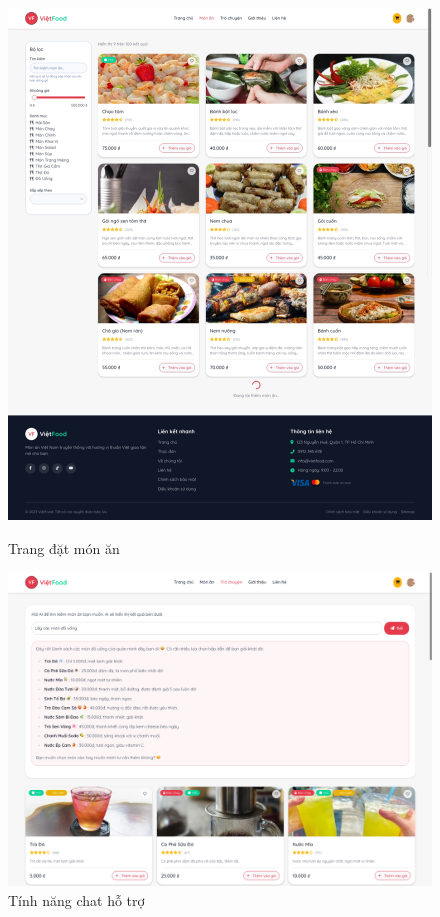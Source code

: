 \begin{figure}[H]
    \centering
    \begin{minipage}{0.48\textwidth}
        \centering
        \includegraphics[width=\textwidth]{images/shopping-page.png}
        \caption{Trang đặt món ăn}
        \label{fig:shopping}
    \end{minipage}
    \hfill
    \begin{minipage}{0.48\textwidth}
        \centering
        \includegraphics[width=\textwidth]{images/chat-page.png}
        \caption{Tính năng chat hỗ trợ}
        \label{fig:chat}
    \end{minipage}
\end{figure}

